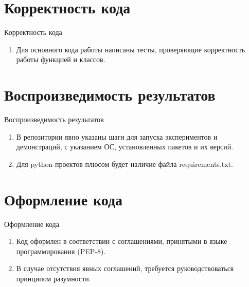 \documentclass[10pt,pdf,hyperref={unicode}]{beamer}
\begin{document}
\section{Корректность кода}
\begin{frame}{Корректность кода}
\bigskip
\begin{enumerate}
    \item Для основного кода работы написаны тесты, проверяющие корректность работы функцией и классов.
\end{enumerate}
\end{frame}
\section{Воспроизведимость результатов}
\begin{frame}{Воспроизведимость результатов}
\bigskip
\begin{enumerate}
    \item В репозитории явно указаны шаги для запуска экспериментов и демонстраций, с указанием ОС, установленных пакетов и их версий.
    \item Для python-проектов плюсом будет наличие файла requirements.txt.
\end{enumerate}
\end{frame}
\section{Оформление кода}
\begin{frame}{Оформление кода}
\bigskip
\begin{enumerate}
    \item Код оформлен в соответствии с соглашениями, принятыми в языке программирования (PEP-8).
    \item В случае отсутствия явных соглашений, требуется руководствоваться принципом разумности.
\end{enumerate}
\end{frame}
\end{document}
